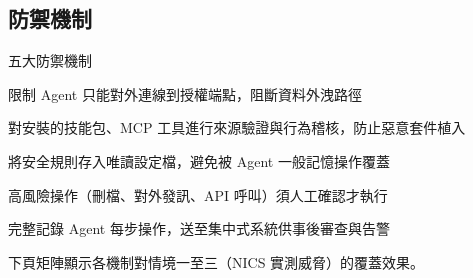 \documentclass[aspectratio=1610]{Common/MyCourseBeamer}
\begin{document}
\subsection{防禦機制}

\begin{frame}{五大防禦機制}

	\begin{description}
		\item[\textbf{網路出口隔離}] 限制 Agent 只能對外連線到授權端點，阻斷資料外洩路徑
		\item[\textbf{第三方套件審查}] 對安裝的技能包、MCP 工具進行來源驗證與行為稽核，防止惡意套件植入
		\item[\textbf{安全守則固化}] 將安全規則存入唯讀設定檔，避免被 Agent 一般記憶操作覆蓋
		\item[\textbf{人機協作(HITL)}] 高風險操作（刪檔、對外發訊、API 呼叫）須人工確認才執行
		\item[\textbf{操作稽核日誌}] 完整記錄 Agent 每步操作，送至集中式系統供事後審查與告警
	\end{description}

	\vspace{0.4em}
	{\small 下頁矩陣顯示各機制對情境一至三（NICS 實測威脅）的覆蓋效果。}

\end{frame}
\end{document}
